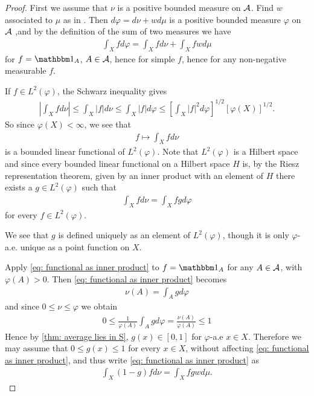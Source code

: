 \documentclass[../../main.tex]{subfiles}
\begin{document}
\begin{proof}
First we assume that $\nu$ is a positive bounded measure on $\mathcal{A}$. Find $w$ associated to $\mu$ as in . Then $d\varphi=d\nu+wd\mu$ is a positive bounded measure $\varphi$ on $\mathcal{A}$ ,and by the definition of the sum of two measures we have
\begin{align*}
	\int_{X}fd\varphi = \int_{X}fd\nu + \int_{X}fwd\mu
\end{align*}
for $f=\ind{A}$, $A\in \mathcal{A}$, hence for simple $f$, hence for any non-negative measurable $f$.

If $f\in L^{2}(\varphi)$, the Schwarz inequality gives
\begin{align*}
	\left|\int_{X}fd\nu \right| \le \int_{X} |f|d\nu \le \int_{X}|f|d\varphi \le \left[ \int_{X}|f|^{2}d\varphi \right]^{1/2} [\varphi(X)]^{1/2}.
\end{align*}
So since $\varphi(X)<\infty$, we see that
\begin{align*}
	f\mapsto \int_{X}fd\nu
\end{align*}
is a bounded linear functional of $L^{2}(\varphi)$. Note that $L^{2}(\varphi)$ is a Hilbert space and since every bounded linear functional on a Hilbert space $H$ is, by the Riesz representation theorem, given by an inner product with an element of $H$ there exists a $g\in L^{2}(\varphi)$ such that
\begin{align}
	\int_{X}fd\nu=\int_{X}fgd\varphi \label{eq: functional as inner product}
\end{align}
for every $f\in L^{2}(\varphi)$.

We see that $g$ is defined uniquely as an element of $L^{2}(\varphi)$, though it is only $\varphi$-a.e. unique as a point function on $X$.

Apply \eqref{eq: functional as inner product} to $f=\ind{A}$ for any $A\in \mathcal{A}$, with $\varphi(A)>0$. Then \eqref{eq: functional as inner product} becomes
\begin{align*}
	\nu(A)=\int_{A}gd\varphi
\end{align*}
and since $0\le \nu \le \varphi$ we obtain
\begin{align*}
	0\le \frac{1}{\varphi(A)}\int_{A}gd\varphi=\frac{\nu(A)}{\varphi(A)}\le 1
\end{align*}
Hence by \cref{thm: average lies in S}, $g(x)\in [0,1]$ for $\varphi$-a.e $x\in X$.
Therefore we may assume that $0\le g(x) \le 1$ for every $x\in X$, without affecting \eqref{eq: functional as inner product}, and thus write \eqref{eq: functional as inner product} as
\begin{align}
	\int_{X}(1-g)fd\nu=\int_{X}fgwd\mu. \label{eq: rewriting}
\end{align}


\end{proof}
\end{document}
